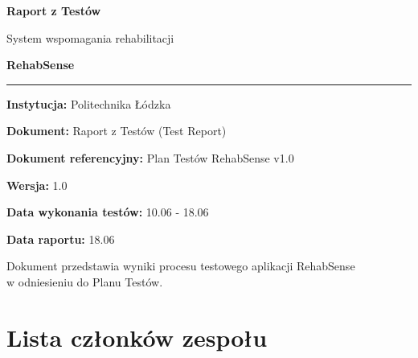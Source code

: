 \documentclass[11pt,a4paper]{article}
\begin{document}
\begin{titlepage}
\centering
\vspace*{2cm}

{\Huge\bfseries\color{primary} Raport z Testów\par}
\vspace{0.5cm}
{\LARGE System wspomagania rehabilitacji\par}
\vspace{0.3cm}
{\Huge\bfseries RehabSense\par}

\vspace{1.2cm}
\rule{0.7\textwidth}{1.2pt}\par
\vspace{1.2cm}

{\large\textbf{Instytucja:} Politechnika Łódzka\par}
\vspace{0.4cm}
{\large\textbf{Dokument:} Raport z Testów (Test Report)\par}
\vspace{0.4cm}
{\large\textbf{Dokument referencyjny:} Plan Testów RehabSense v1.0\par}
\vspace{0.4cm}
{\large\textbf{Wersja:} 1.0\par}
\vspace{0.4cm}
{\large\textbf{Data wykonania testów:} 10.06 - 18.06\par}
\vspace{0.4cm}
{\large\textbf{Data raportu:} 18.06\par}

\vfill
{\small Dokument przedstawia wyniki procesu testowego aplikacji RehabSense\\ w odniesieniu do Planu Testów.}
\end{titlepage}

\section*{Lista członków zespołu}
\end{document}
